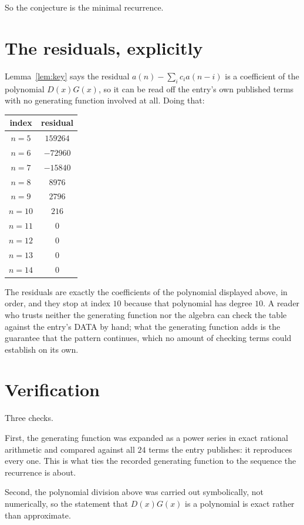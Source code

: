 \documentclass[11pt,a4paper]{article}
\theoremstyle{plain}
\theoremstyle{definition}
\begin{document}
So the conjecture is the minimal recurrence.

\section{The residuals, explicitly}

Lemma~\ref{lem:key} says the residual $a(n)-\sum_ic_ia(n-i)$ is a coefficient of the
polynomial $D(x)G(x)$, so it can be read off the entry's own published terms with no
generating function involved at all. Doing that:
\begin{center}
\begin{tabular}{cc}
index & residual \\ \hline
$n=5$ & $159264$ \\
$n=6$ & $-72960$ \\
$n=7$ & $-15840$ \\
$n=8$ & $8976$ \\
$n=9$ & $2796$ \\
$n=10$ & $216$ \\
$n=11$ & $0$ \\
$n=12$ & $0$ \\
$n=13$ & $0$ \\
$n=14$ & $0$
\end{tabular}
\end{center}
The residuals are exactly the coefficients of the polynomial displayed above, in order, and
they stop at index $10$ because that polynomial has degree $10$. A reader who trusts
neither the generating function nor the algebra can check the table against the entry's DATA
by hand; what the generating function adds is the guarantee that the pattern continues, which
no amount of checking terms could establish on its own.

\section{Verification}

Three checks.

First, the generating function was expanded as a power series in exact rational arithmetic and
compared against all $24$ terms the entry publishes: it reproduces every one. This is
what ties the recorded generating function to the sequence the recurrence is about.

Second, the polynomial division above was carried out symbolically, not numerically, so the
statement that $D(x)G(x)$ is a polynomial is exact rather than approximate.
\end{document}
